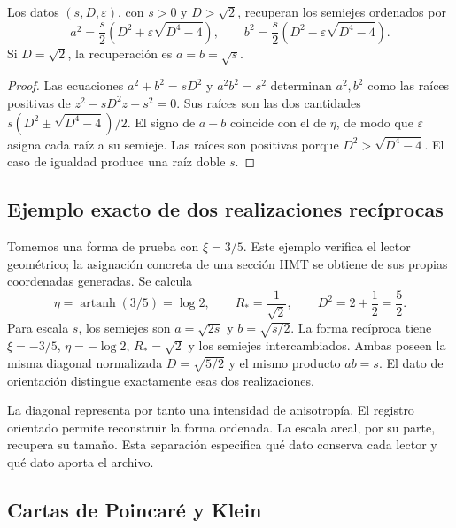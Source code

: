 \begin{corollary}
\label{hrr:semiejes-recuperacion}
Los datos \((s,D,\varepsilon)\), con \(s>0\) y
\(D>\sqrt2\), recuperan los semiejes ordenados por
\begin{equation}
 a^2=\frac{s}{2}\left(D^2+\varepsilon\sqrt{D^4-4}\right),
 \qquad
 b^2=\frac{s}{2}\left(D^2-\varepsilon\sqrt{D^4-4}\right).
 \label{hrr:semiejes-radicales}
\end{equation}
Si \(D=\sqrt2\), la recuperación es \(a=b=\sqrt{s}\).
\end{corollary}
\begin{proof}
Las ecuaciones \(a^2+b^2=sD^2\) y \(a^2b^2=s^2\)
determinan \(a^2,b^2\) como las raíces positivas de
\(z^2-sD^2z+s^2=0\). Sus raíces son las dos cantidades
\(s(D^2\pm\sqrt{D^4-4})/2\). El signo de
\(a-b\) coincide con el de \(\eta\), de modo que
\(\varepsilon\) asigna cada raíz a su semieje. Las raíces son
positivas porque \(D^2>\sqrt{D^4-4}\). El caso de igualdad
produce una raíz doble \(s\).
\end{proof}

\subsection{Ejemplo exacto de dos realizaciones recíprocas}

Tomemos una forma de prueba con \(\xi=3/5\). Este ejemplo verifica
el lector geométrico; la asignación concreta de una sección HMT se
obtiene de sus propias coordenadas generadas. Se calcula
\[
 \eta=\operatorname{artanh}(3/5)=\log2,\qquad
 R_*=\frac1{\sqrt2},\qquad
 D^2=2+\frac12=\frac52.
\]
Para escala \(s\), los semiejes son
\(a=\sqrt{2s}\) y \(b=\sqrt{s/2}\). La forma recíproca tiene
\(\xi=-3/5\), \(\eta=-\log2\), \(R_*=\sqrt2\) y los
semiejes intercambiados. Ambas poseen la misma diagonal normalizada
\(D=\sqrt{5/2}\) y el mismo producto \(ab=s\). El dato de
orientación distingue exactamente esas dos realizaciones.

La diagonal representa por tanto una intensidad de anisotropía. El
registro orientado permite reconstruir la forma ordenada. La escala
areal, por su parte, recupera su tamaño. Esta separación especifica
qué dato conserva cada lector y qué dato aporta el archivo.

\subsection{Cartas de Poincaré y Klein}

